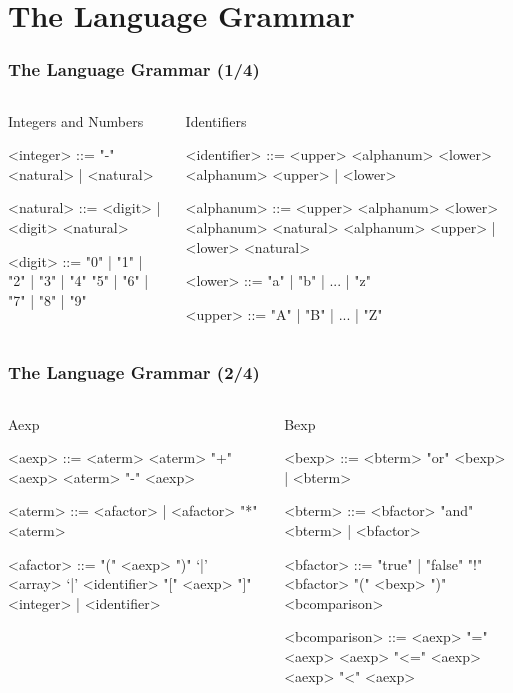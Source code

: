 \documentclass{beamer}
\begin{document}
\section{The Language Grammar}
\begin{frame}[fragile]
\footnotesize
\frametitle{The Language Grammar (1/4)}
\begin{columns}
\begin{block}{Integers and Numbers}
\begin{grammar}
	<integer> ::= "-" <natural> | <natural>

	<natural> ::= <digit> | <digit> <natural>

	<digit> ::= "0" | "1" | "2" | "3" | "4"
	\alt "5" | "6" | "7" | "8" | "9"
\end{grammar}
\end{block}
\begin{block}{Identifiers}
\begin{grammar}
	<identifier> ::= <upper> <alphanum>
	\alt <lower> <alphanum>
	\alt <upper> | <lower> 
	
	<alphanum> ::= <upper> <alphanum>
	\alt <lower> <alphanum>
	\alt <natural> <alphanum>
	\alt <upper> | <lower>
	\alt <natural>

	<lower> ::= "a" | "b" | ... | "z"

	<upper> ::= "A" | "B" | ... | "Z"
\end{grammar}
\end{block}
\end{columns}
\end{frame}

\begin{frame}[fragile]
	\footnotesize
	\frametitle{The Language Grammar (2/4)}
	\begin{columns}
		\begin{block}{Aexp}
			\begin{grammar}
				<aexp> ::= <aterm>
				\alt <aterm> "+" <aexp>
				\alt <aterm> "-" <aexp>

				<aterm> ::= <afactor> | <afactor> "*" <aterm>

				<afactor> ::= "(" <aexp> ")"
				\alt `|' <array> `|'
				 "[" <aexp> "]"
				\alt <integer> | <identifier>
			\end{grammar}
		\end{block}
		\column{0.45\textwidth}
		\begin{block}{Bexp}
			\begin{grammar}
				<bexp> ::= <bterm> "or" <bexp> | <bterm>

				<bterm> ::= <bfactor> "and" <bterm> | <bfactor>

				<bfactor> ::= "true" | "false"
				\alt "!" <bfactor>
				\alt "(" <bexp> ")"
				\alt <bcomparison>

				<bcomparison> ::= <aexp> "=" <aexp>
				\alt <aexp> "<=" <aexp>
				\alt <aexp> "<" <aexp>
			\end{grammar}
		\end{block}
	\end{columns}
\end{frame}
\end{document}
